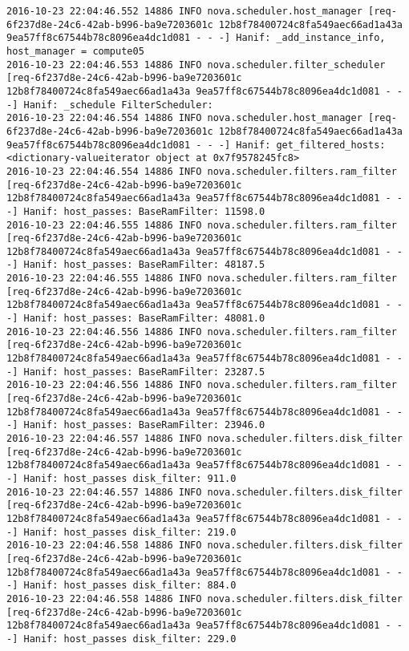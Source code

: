 \begin{lstlisting}[frame=single, caption={The filter scheduler code trace log}, label={lst:filterschedulercodetracelog}]
2016-10-23 22:04:46.552 14886 INFO nova.scheduler.host_manager [req-6f237d8e-24c6-42ab-b996-ba9e7203601c 12b8f78400724c8fa549aec66ad1a43a 9ea57ff8c67544b78c8096ea4dc1d081 - - -] Hanif: _add_instance_info, host_manager = compute05
2016-10-23 22:04:46.553 14886 INFO nova.scheduler.filter_scheduler [req-6f237d8e-24c6-42ab-b996-ba9e7203601c 12b8f78400724c8fa549aec66ad1a43a 9ea57ff8c67544b78c8096ea4dc1d081 - - -] Hanif: _schedule FilterScheduler:
2016-10-23 22:04:46.554 14886 INFO nova.scheduler.host_manager [req-6f237d8e-24c6-42ab-b996-ba9e7203601c 12b8f78400724c8fa549aec66ad1a43a 9ea57ff8c67544b78c8096ea4dc1d081 - - -] Hanif: get_filtered_hosts: <dictionary-valueiterator object at 0x7f9578245fc8>
2016-10-23 22:04:46.554 14886 INFO nova.scheduler.filters.ram_filter [req-6f237d8e-24c6-42ab-b996-ba9e7203601c 12b8f78400724c8fa549aec66ad1a43a 9ea57ff8c67544b78c8096ea4dc1d081 - - -] Hanif: host_passes: BaseRamFilter: 11598.0
2016-10-23 22:04:46.555 14886 INFO nova.scheduler.filters.ram_filter [req-6f237d8e-24c6-42ab-b996-ba9e7203601c 12b8f78400724c8fa549aec66ad1a43a 9ea57ff8c67544b78c8096ea4dc1d081 - - -] Hanif: host_passes: BaseRamFilter: 48187.5
2016-10-23 22:04:46.555 14886 INFO nova.scheduler.filters.ram_filter [req-6f237d8e-24c6-42ab-b996-ba9e7203601c 12b8f78400724c8fa549aec66ad1a43a 9ea57ff8c67544b78c8096ea4dc1d081 - - -] Hanif: host_passes: BaseRamFilter: 48081.0
2016-10-23 22:04:46.556 14886 INFO nova.scheduler.filters.ram_filter [req-6f237d8e-24c6-42ab-b996-ba9e7203601c 12b8f78400724c8fa549aec66ad1a43a 9ea57ff8c67544b78c8096ea4dc1d081 - - -] Hanif: host_passes: BaseRamFilter: 23287.5
2016-10-23 22:04:46.556 14886 INFO nova.scheduler.filters.ram_filter [req-6f237d8e-24c6-42ab-b996-ba9e7203601c 12b8f78400724c8fa549aec66ad1a43a 9ea57ff8c67544b78c8096ea4dc1d081 - - -] Hanif: host_passes: BaseRamFilter: 23946.0
2016-10-23 22:04:46.557 14886 INFO nova.scheduler.filters.disk_filter [req-6f237d8e-24c6-42ab-b996-ba9e7203601c 12b8f78400724c8fa549aec66ad1a43a 9ea57ff8c67544b78c8096ea4dc1d081 - - -] Hanif: host_passes disk_filter: 911.0
2016-10-23 22:04:46.557 14886 INFO nova.scheduler.filters.disk_filter [req-6f237d8e-24c6-42ab-b996-ba9e7203601c 12b8f78400724c8fa549aec66ad1a43a 9ea57ff8c67544b78c8096ea4dc1d081 - - -] Hanif: host_passes disk_filter: 219.0
2016-10-23 22:04:46.558 14886 INFO nova.scheduler.filters.disk_filter [req-6f237d8e-24c6-42ab-b996-ba9e7203601c 12b8f78400724c8fa549aec66ad1a43a 9ea57ff8c67544b78c8096ea4dc1d081 - - -] Hanif: host_passes disk_filter: 884.0
2016-10-23 22:04:46.558 14886 INFO nova.scheduler.filters.disk_filter [req-6f237d8e-24c6-42ab-b996-ba9e7203601c 12b8f78400724c8fa549aec66ad1a43a 9ea57ff8c67544b78c8096ea4dc1d081 - - -] Hanif: host_passes disk_filter: 229.0

\end{lstlisting}
